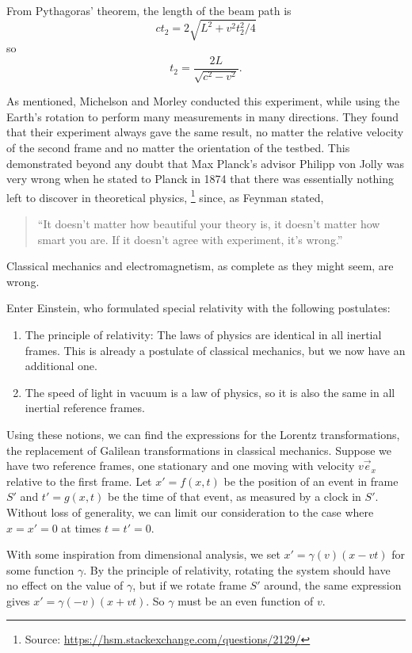 From Pythagoras' theorem, the length of the beam path is
\[
  c t_2 = 2 \sqrt{L^2 + v^2 t_2^2 / 4}
\]
so
\[
  t_2 = \frac{2 L}{\sqrt{c^2 - v^2}}.
\]

As mentioned, Michelson and Morley conducted this experiment, while using the
Earth's rotation to perform many measurements in many directions.
They found that their experiment always gave the same result, no matter the
relative velocity of the second frame and no matter the orientation of the
testbed.
This demonstrated beyond any doubt that Max Planck's advisor Philipp von Jolly
was very wrong when he stated to Planck in 1874 that there was essentially
nothing left to discover in theoretical physics,%
\footnote{Source: \url{https://hsm.stackexchange.com/questions/2129/}}
since, as Feynman stated,
\begin{quote}
  \enquote{It doesn't matter how beautiful your theory is, it doesn't matter how smart
  you are. If it doesn't agree with experiment, it's wrong.}
\end{quote}
Classical mechanics and electromagnetism, as complete as they might seem, are
wrong.


Enter Einstein, who formulated special relativity with the following postulates:
\begin{enumerate}
\item The principle of relativity: The laws of physics are identical in all
  inertial frames.
  This is already a postulate of classical mechanics, but we now have an
  additional one.
\item The speed of light in vacuum is a law of physics, so it is also the same
  in all inertial reference frames.
\end{enumerate}
%
Using these notions, we can find the expressions for the Lorentz
transformations, the replacement of Galilean transformations in classical
mechanics.
Suppose we have two reference frames, one stationary and one moving with
velocity $v \vec{e}_x$ relative to the first frame.
Let $x' = f(x, t)$ be the position of an event in frame $S'$ and $t' = g(x,t)$
be the time of that event, as measured by a clock in $S'$.
Without loss of generality, we can limit our consideration to the case where $x
= x' = 0$ at times $t = t' = 0$.

With some inspiration from dimensional analysis, we set $x' = \gamma(v) (x -
vt)$ for some function $\gamma$.
By the principle of relativity, rotating the system should have no effect on the
value of $\gamma$, but if we rotate frame $S'$ around, the same expression gives
$x' = \gamma(-v) (x + vt)$.
So $\gamma$ must be an even function of $v$.

